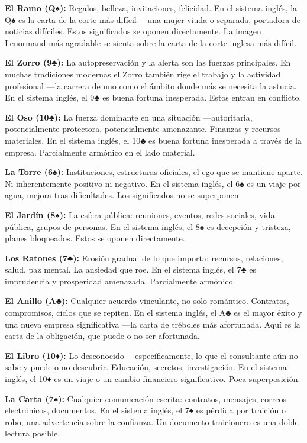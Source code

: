 \textbf{El Ramo (Q♠):} Regalos, belleza, invitaciones, felicidad. En el sistema inglés, la Q♠ es la carta de la corte más difícil ---una mujer viuda o separada, portadora de noticias difíciles. Estos significados se oponen directamente. La imagen Lenormand más agradable se sienta sobre la carta de la corte inglesa más difícil.

\textbf{El Zorro (9♣):} La autopreservación y la alerta son las fuerzas principales. En muchas tradiciones modernas el Zorro también rige el trabajo y la actividad profesional ---la carrera de uno como el ámbito donde más se necesita la astucia. En el sistema inglés, el 9♣ es buena fortuna inesperada. Estos entran en conflicto.

\textbf{El Oso (10♣):} La fuerza dominante en una situación ---autoritaria, potencialmente protectora, potencialmente amenazante. Finanzas y recursos materiales. En el sistema inglés, el 10♣ es buena fortuna inesperada a través de la empresa. Parcialmente armónico en el lado material.

\textbf{La Torre (6♠):} Instituciones, estructuras oficiales, el ego que se mantiene aparte. Ni inherentemente positivo ni negativo. En el sistema inglés, el 6♠ es un viaje por agua, mejora tras dificultades. Los significados no se superponen.

\textbf{El Jardín (8♠):} La esfera pública: reuniones, eventos, redes sociales, vida pública, grupos de personas. En el sistema inglés, el 8♠ es decepción y tristeza, planes bloqueados. Estos se oponen directamente.

\textbf{Los Ratones (7♣):} Erosión gradual de lo que importa: recursos, relaciones, salud, paz mental. La ansiedad que roe. En el sistema inglés, el 7♣ es imprudencia y prosperidad amenazada. Parcialmente armónico.

\textbf{El Anillo (A♣):} Cualquier acuerdo vinculante, no solo romántico. Contratos, compromisos, ciclos que se repiten. En el sistema inglés, el A♣ es el mayor éxito y una nueva empresa significativa ---la carta de tréboles más afortunada. Aquí es la carta de la obligación, que puede o no ser afortunada.

\textbf{El Libro (10♦):} Lo desconocido ---específicamente, lo que el consultante aún no sabe y puede o no descubrir. Educación, secretos, investigación. En el sistema inglés, el 10♦ es un viaje o un cambio financiero significativo. Poca superposición.

\textbf{La Carta (7♠):} Cualquier comunicación escrita: contratos, mensajes, correos electrónicos, documentos. En el sistema inglés, el 7♠ es pérdida por traición o robo, una advertencia sobre la confianza. Un documento traicionero es una doble lectura posible.

